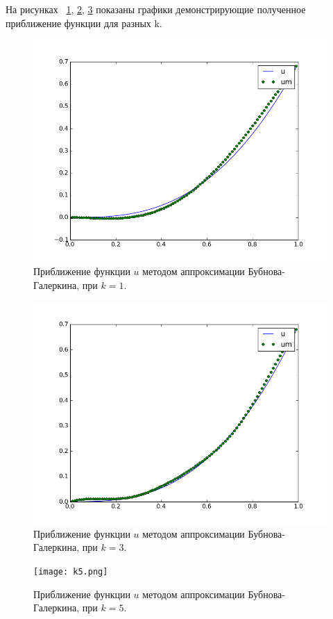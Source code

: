 \documentclass[12pt,a4paper,oneside]{extarticle}
\begin{document}
    На рисунках ~\ref{pic:k1}, \ref{pic:k3}, \ref{pic:k5} показаны графики демонстрирующие полученное приближение функции для разных k.
    \begin{figure}[ht!]
        \centering
        \includegraphics[scale=0.8]{k1.png}
        \caption{Приближение функции $u$ методом аппроксимации Бубнова-Галеркина, при $k = 1$.}
        \label{pic:k1}
    \end{figure}

    \begin{figure}[ht!]
        \centering
        \includegraphics[scale=0.8]{k3.png}
        \caption{Приближение функции $u$ методом аппроксимации Бубнова-Галеркина, при $k = 3$.}
        \label{pic:k3}
    \end{figure}

    \begin{figure}[ht!]
        \centering
        \texttt{[image: k5.png]}
        \caption{Приближение функции $u$ методом аппроксимации Бубнова-Галеркина, при $k = 5$.}
        \label{pic:k5}
    \end{figure}
\end{document}
